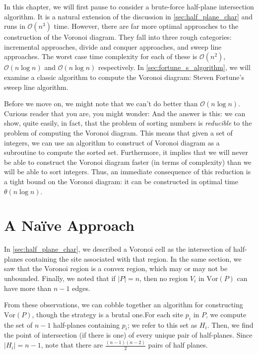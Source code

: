 \documentclass[12pt,twoside]{reedthesis}
\begin{document}
    In this chapter, we will first pause to consider a brute-force half-plane intersection algorithm. It is a natural extension of the discussion in \cref{sec:half_plane_char} and runs in $\mathcal{O}(n^3)$ time. However, there are far more optimal approaches to the construction of the Voronoi diagram. They fall into three rough categories: incremental approaches, divide and conquer approaches, and sweep line approaches. The worst case time complexity for each of these is $\mathcal{O}(n^{2})$, $\mathcal{O}(n\log n)$ and $\mathcal{O}(n\log n)$ respectively. In \cref{sec:fortune_s_algorithm}, we will examine a classic algorithm to compute the Voronoi diagram: Steven Fortune's sweep line algorithm.\par

    Before we move on, we might note that we can't do better than $\mathcal{O}(n\log n)$. Curious reader that you are, you might wonder:  And the answer is this: we can show, quite easily, in fact, that the problem of sorting numbers is \emph{reducible} to the problem of computing the Voronoi diagram. This means that given a set of integers, we can use an algorithm to construct of Voronoi diagram as a subroutine to compute the sorted set. Furthermore, it implies that we will never be able to construct the Voronoi diagram faster (in terms of complexity) than we will be able to sort integers. Thus, an immediate consequence of this reduction is a tight bound on the Voronoi diagram: it can be constructed in optimal time $\theta(n\log n)$.\par

  \section{A Na{\"i}ve Approach} %
  \label{sec:a_naive_approach}
    In \cref{sec:half_plane_char}, we described a Voronoi cell as the intersection of half-planes containing the site associated with that region. In the same section, we saw that the Voronoi region is a convex region, which may or may not be unbounded. Finally, we noted that if $|P| = n$, then no region $V_{i}$ in $\mbox{Vor}(P)$ can have more than $n-1$ edges. \par


    From these observations, we can cobble together an algorithm for constructing $\mbox{Vor}(P)$, though the strategy is a brutal one.For each site $p_{i}$ in $P$, we compute the set of $n-1$ half-planes containing $p_{i}$; we refer to this set as $H_{i}$. Then, we find the point of intersection (if there is one) of every unique pair of half-planes. Since $|H_{i}| = n-1$, note that there are $\frac{(n-1)(n-2)}{2}$ pairs of half planes. \par
\end{document}
